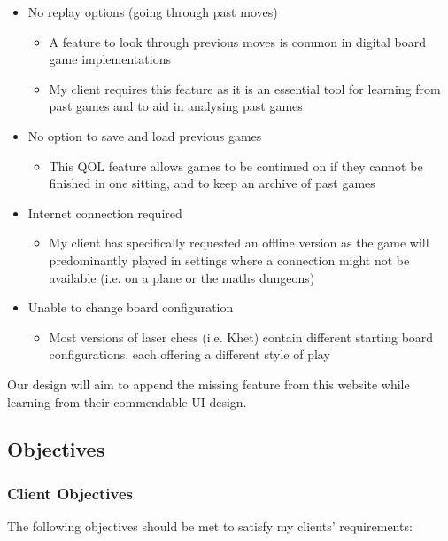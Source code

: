 \documentclass[../main/main.tex]{subfiles}
\begin{document}
\begin{itemize}
\item No replay options (going through past moves)
    \begin{itemize}
    \item A feature to look through previous moves is common in digital board game implementations
    \item My client requires this feature as it is an essential tool for learning from past games and to aid in analysing past games
    \end{itemize}
\item No option to save and load previous games
    \begin{itemize}
    \item This QOL feature allows games to be continued on if they cannot be finished in one sitting, and to keep an archive of past games
    \end{itemize}
\item Internet connection required
    \begin{itemize}
    \item My client has specifically requested an offline version as the game will predominantly played in settings where a connection might not be available (i.e. on a plane or the maths dungeons)
    \end{itemize}
\item Unable to change board configuration
    \begin{itemize}
    \item Most versions of laser chess (i.e. Khet) contain different starting board configurations, each offering a different style of play
    \end{itemize}
\end{itemize}
Our design will aim to append the missing feature from this website while learning from their commendable UI design.

\subsection{Objectives}
\subsubsection{Client Objectives}
The following objectives should be met to satisfy my clients’ requirements:
\end{document}

